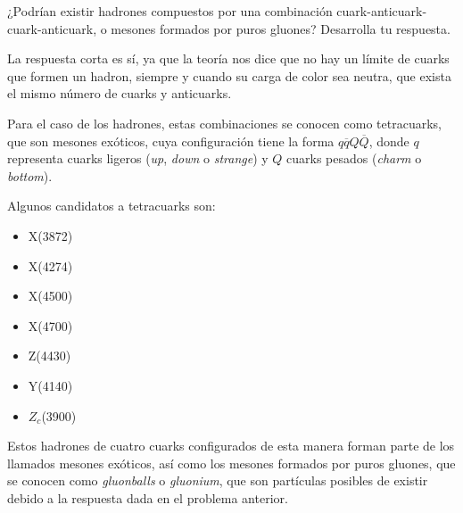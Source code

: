 \documentclass[./../main.tex]{subfiles}
\begin{document}
	\begin{exercise}
		¿Podrían existir hadrones compuestos por una combinación cuark-anticuark-cuark-anticuark, o mesones formados por puros gluones? Desarrolla tu respuesta.

		\begin{solution}
			La respuesta corta es sí, ya que la teoría nos dice que no hay un límite de cuarks que formen un hadron, siempre y cuando su carga de color sea neutra, \idest que exista el mismo número de cuarks y anticuarks.

			Para el caso de los hadrones, estas combinaciones se conocen como tetracuarks, que son mesones exóticos, cuya configuración tiene la forma \(q\overline{q}Q\overline{Q}\), donde \(q\) representa cuarks ligeros (\emph{up}, \emph{down} o \emph{strange}) y \(Q\) cuarks pesados (\emph{charm} o \emph{bottom}).

			Algunos candidatos a tetracuarks son:

			\begin{itemize}[twocol]
				\item X(3872)
				\item X(4274)
				\item X(4500)
				\item X(4700)
				\item Z(4430)
				\item Y(4140)
				\item \(Z_{c}\)(3900)
			\end{itemize}

			Estos hadrones de cuatro cuarks configurados de esta manera forman parte de los llamados mesones exóticos, así como los mesones formados por puros gluones, que se conocen como \emph{gluonballs} o \emph{gluonium}, que son partículas posibles de existir debido a la respuesta dada en el problema anterior.
		\end{solution}
	\end{exercise}
\end{document}
